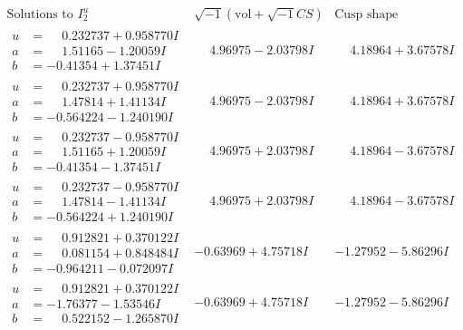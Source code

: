 \documentclass[1p]{elsarticle_modified}
\theoremstyle{definition}
\newcommand{\I}{\sqrt{-1}}
\begin{document}
$$\begin{array}{c|c|c}  
\text{Solutions to }I^u_{2}& \I (\text{vol} + \sqrt{-1}CS) & \text{Cusp shape}\\
 \hline 
\begin{aligned}
u &= \phantom{-}0.232737 + 0.958770 I \\
a &= \phantom{-}1.51165 - 1.20059 I \\
b &= -0.41354 + 1.37451 I\end{aligned}
 & \phantom{-}4.96975 - 2.03798 I & \phantom{-}4.18964 + 3.67578 I \\ \hline\begin{aligned}
u &= \phantom{-}0.232737 + 0.958770 I \\
a &= \phantom{-}1.47814 + 1.41134 I \\
b &= -0.564224 - 1.240190 I\end{aligned}
 & \phantom{-}4.96975 - 2.03798 I & \phantom{-}4.18964 + 3.67578 I \\ \hline\begin{aligned}
u &= \phantom{-}0.232737 - 0.958770 I \\
a &= \phantom{-}1.51165 + 1.20059 I \\
b &= -0.41354 - 1.37451 I\end{aligned}
 & \phantom{-}4.96975 + 2.03798 I & \phantom{-}4.18964 - 3.67578 I \\ \hline\begin{aligned}
u &= \phantom{-}0.232737 - 0.958770 I \\
a &= \phantom{-}1.47814 - 1.41134 I \\
b &= -0.564224 + 1.240190 I\end{aligned}
 & \phantom{-}4.96975 + 2.03798 I & \phantom{-}4.18964 - 3.67578 I \\ \hline\begin{aligned}
u &= \phantom{-}0.912821 + 0.370122 I \\
a &= \phantom{-}0.081154 + 0.848484 I \\
b &= -0.964211 - 0.072097 I\end{aligned}
 & -0.63969 + 4.75718 I & -1.27952 - 5.86296 I \\ \hline\begin{aligned}
u &= \phantom{-}0.912821 + 0.370122 I \\
a &= -1.76377 - 1.53546 I \\
b &= \phantom{-}0.522152 - 1.265870 I\end{aligned}
 & -0.63969 + 4.75718 I & -1.27952 - 5.86296 I \\ \hline\begin{aligned}

\end{aligned}
\end{array}$$
\end{document}
